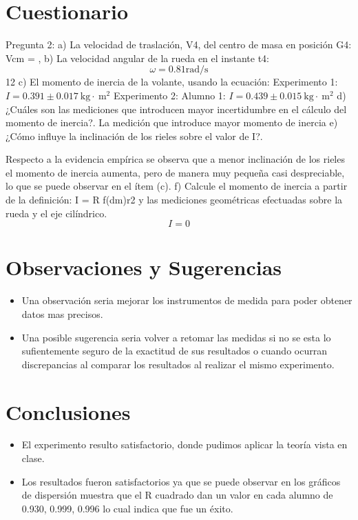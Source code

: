 \documentclass[10pt]{article}
\begin{document}
\section{Cuestionario}
Pregunta 2:
a) La velocidad de traslación, V4, del centro de masa en posición G4: Vcm = ,
b) La velocidad angular de la rueda en el instante t4:
$$
\omega=0.81 \mathrm{rad} / \mathrm{s}
$$
12
c) El momento de inercia de la volante, usando la ecuación: Experimento 1: $I=0.391 \pm 0.017 \mathrm{~kg} \cdot \mathrm{~m}^2$ Experimento 2: Alumno 1: $I=0.439 \pm 0.015 \mathrm{~kg} \cdot \mathrm{~m}^2$
d) ¿Cuáles son las mediciones que introducen mayor incertidumbre en el cálculo del momento de inercia?.
La medición que introduce mayor momento de inercia
e) ¿Cómo influye la inclinación de los rieles sobre el valor de I?.

Respecto a la evidencia empírica se observa que a menor inclinación de los rieles el momento de inercia aumenta, pero de manera muy pequeña casi despreciable, lo que se puede observar en el ítem (c).
f) Calcule el momento de inercia a partir de la definición: I = R f(dm)r2 y las mediciones geométricas efectuadas sobre la rueda y el eje cilíndrico.
$$
I=0
$$

\section{Observaciones y Sugerencias}

\begin{itemize}

   \item Una observación seria mejorar los instrumentos de medida para poder obtener datos mas precisos.
   \item Una posible sugerencia seria volver a retomar las medidas si no se  esta lo sufientemente seguro de la exactitud de sus resultados o cuando ocurran discrepancias al comparar los resultados al realizar el mismo experimento.

\end{itemize}

\section{Conclusiones}
\begin{itemize}
\item El experimento resulto satisfactorio, donde pudimos aplicar la teoría vista en clase.
\item Los resultados fueron satisfactorios ya que se puede observar en los gráficos de dispersión muestra que el R cuadrado dan un valor en cada alumno de 0.930, 0.999, 0.996 lo cual indica que fue un éxito.
\end{itemize}
\end{document}
